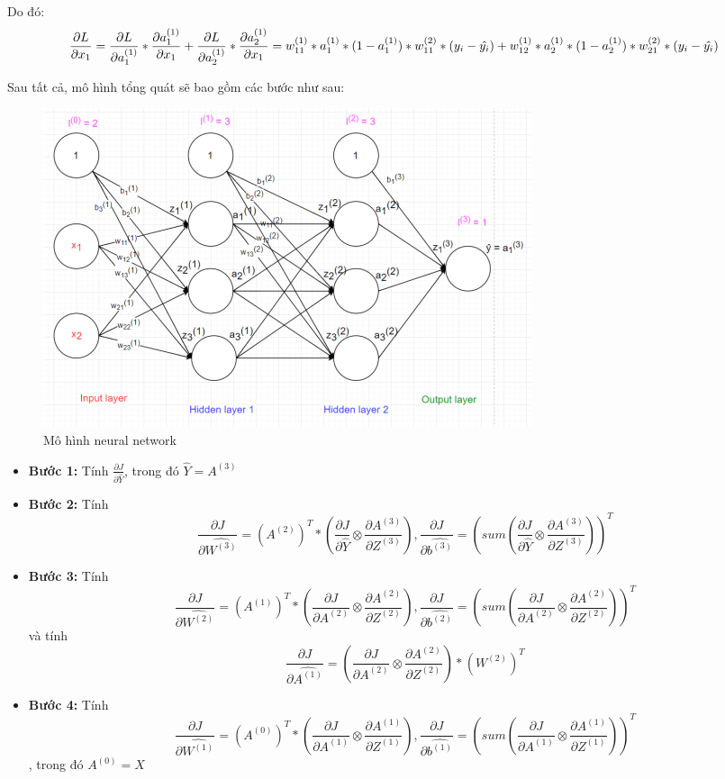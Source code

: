 Do đó:
$$\frac{\partial L}{\partial x_1} = \frac{\partial L}{\partial a_1^{(1)}} * \frac{\partial a_1^{(1)}}{\partial x_1} + \frac{\partial L}{\partial a_2^{(1)}} * \frac{\partial a_2^{(1)}}{\partial x_1} =  w_{11}^{(1)}* a_1 ^ {(1)} * (1 - a_1^{(1)}) * w_{11}^{(2)} * (y_i - \hat{y_i}) + w_{12}^{(1)}* a_2 ^ {(1)} * (1 - a_2^{(1)}) * w_{21}^{(2)} * (y_i - \hat{y_i})  \newline$$

Sau tất cả, mô hình tổng quát sẽ bao gồm các bước như sau:

\FloatBarrier
\begin{figure}[htp]
\begin{center}
\includegraphics[scale=0.75]{chap2/c2_figs/3.png}
\end{center}
\caption{Mô hình neural network}
\label{fig:feed_forward}
\end{figure}
\FloatBarrier

\begin{itemize}
\item \textbf{Bước 1:} Tính $\frac{\partial J}{\partial \hat{Y}}$, trong đó $\hat{Y} = A^{(3)}$
\item \textbf{Bước 2:} Tính $$\frac{\partial J}{\partial \hat{W^{(3)}}}= (A^{(2)})^T * (\frac{\partial J}{\partial \hat{Y}} \otimes \frac{\partial A^{(3)}}{\partial Z^{(3)}}),  \frac{\partial J}{\partial \hat{b^{(3)}}}= (sum( \frac{\partial J}{\partial \hat{Y}} \otimes \frac{\partial A^{(3)}}{\partial Z^{(3)}}))^T$$
\item \textbf{Bước 3:} Tính $$\frac{\partial J}{\partial \hat{W^{(2)}}}= (A^{(1)})^T * (\frac{\partial J}{\partial A^{(2)}} \otimes \frac{\partial A^{(2)}}{\partial Z^{(2)}}),  \frac{\partial J}{\partial \hat{b^{(2)}}}= (sum (\frac{\partial J}{\partial A^{(2)}} \otimes \frac{\partial A^{(2)}}{\partial Z^{(2)}}))^T$$ và tính $$\frac{\partial J}{\partial \hat{A^{(1)}}}= ( \frac {\partial J}{\partial A^{(2)}} \otimes \frac{\partial A^{(2)}}{\partial Z^{(2)}}) * (W^{(2)})^T$$ 
\item \textbf{Bước 4:} Tính $$\frac{\partial J}{\partial \hat{W^{(1)}}}= (A^{(0)})^T  * (\frac{\partial J}{\partial A^{(1)}} \otimes \frac{\partial A^{(1)}}{\partial Z^{(1)}}),  \frac{\partial J}{\partial \hat{b^{(1)}}}= (sum (\frac{\partial J}{\partial A^{(1)}} \otimes \frac{\partial A^{(1)}}{\partial Z^{(1)}}))^T$$ , trong đó $A^{(0)} = X$
\end{itemize}

